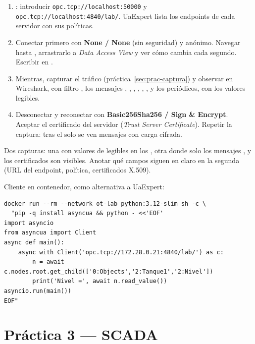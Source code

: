 \begin{enumerate}
  \item {}: introducir \nolinkurl{opc.tcp://localhost:50000} y \nolinkurl{opc.tcp://localhost:4840/lab/}. UaExpert lista los endpoints de cada servidor con sus políticas.
  \item Conectar primero con \textbf{None / None} (sin seguridad) y anónimo. Navegar hasta , arrastrarlo a \emph{Data Access View} y ver cómo cambia cada segundo. Escribir  en .
  \item Mientras, capturar el tráfico (práctica~\ref{sec:prac-captura}) y observar en Wireshark, con filtro , los mensajes , , , , , ,  y los  periódicos, con los valores legibles.
  \item Desconectar y reconectar con \textbf{Basic256Sha256 / Sign \& Encrypt}. Aceptar el certificado del servidor (\emph{Trust Server Certificate}). Repetir la captura: tras el  solo se ven mensajes  con carga cifrada.
\end{enumerate}

\begin{ok}
Dos capturas: una con valores de  legibles en los , otra donde solo los mensajes ,  y los certificados son visibles. Anotar qué campos siguen en claro en la segunda (URL del endpoint, política, certificados X.509).
\end{ok}

Cliente en contenedor, como alternativa a UaExpert:

\begin{lstlisting}[style=bash]
docker run --rm --network ot-lab python:3.12-slim sh -c \
  "pip -q install asyncua && python - <<'EOF'
import asyncio
from asyncua import Client
async def main():
    async with Client('opc.tcp://172.28.0.21:4840/lab/') as c:
        n = await c.nodes.root.get_child(['0:Objects','2:Tanque1','2:Nivel'])
        print('Nivel =', await n.read_value())
asyncio.run(main())
EOF"
\end{lstlisting}

\section{Práctica 3 --- SCADA}
\label{sec:prac-scada}

